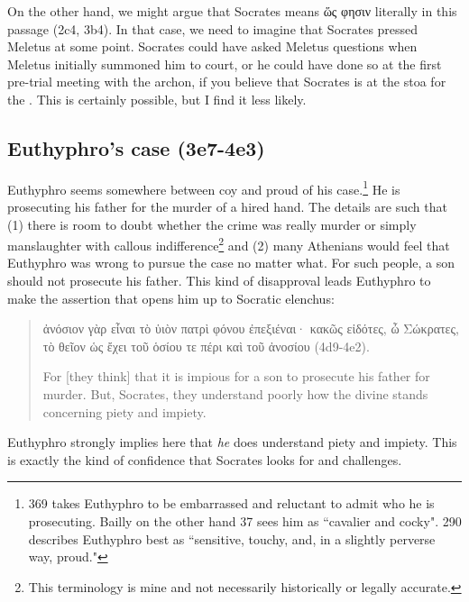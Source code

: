 \documentclass[11pt]{article}
\begin{document}
On the other hand, we might argue that Socrates means {\g ὥς φησιν} literally in this passage (2c4, 3b4).  In that case, we need to imagine that Socrates pressed Meletus at some point.  Socrates could have asked Meletus questions when Meletus initially summoned him to court, or he could have done so at the first pre-trial meeting with the archon, if you believe that Socrates is at the stoa for the .  This is certainly possible, but I find it less likely.


\subsection{Euthyphro's case (3e7-4e3)}

Euthyphro seems somewhere between coy and proud of his
case.\footnote{\citet{geach1966} 369 takes Euthyphro to be embarrassed and
reluctant to admit who he is prosecuting.  Bailly on the other hand
\citeyearpar{bailly2003} 37 sees him as ``cavalier and cocky".
\citet{nehamas1975} 290 describes Euthyphro best as ``sensitive, touchy,
and, in a slightly perverse way, proud."}  He is prosecuting his father for
the murder of a hired hand.  The details are such that (1) there is room to
doubt whether the crime was really murder or simply manslaughter with
callous indifference\footnote{This terminology is mine and not necessarily
historically or legally accurate.} and (2) many Athenians would feel that
Euthyphro was wrong to pursue the case no matter what.  For such people,
a son should not prosecute his father.  This kind of disapproval leads
Euthyphro to make the assertion that opens him up to Socratic elenchus:

\begin{quote}

    {\g
    ἀνόσιον γὰρ εἶναι τὸ ὑιὸν πατρὶ φόνου ἐπεξιέναι· κακῶς εἰδότες,
    ὦ Σώκρατες, τὸ θεῖον ὡς ἔχει τοῦ ὁσίου τε πέρι καὶ τοῦ ἀνοσίου
    } (4d9-4e2).

    For [they think] that it is impious for a son to prosecute his father
    for murder.  But, Socrates, they understand poorly how the divine
    stands concerning piety and impiety.

\end{quote}

Euthyphro strongly implies here that \emph{he} does understand piety and
impiety.  This is exactly the kind of confidence that Socrates looks for and
challenges.
\end{document}
